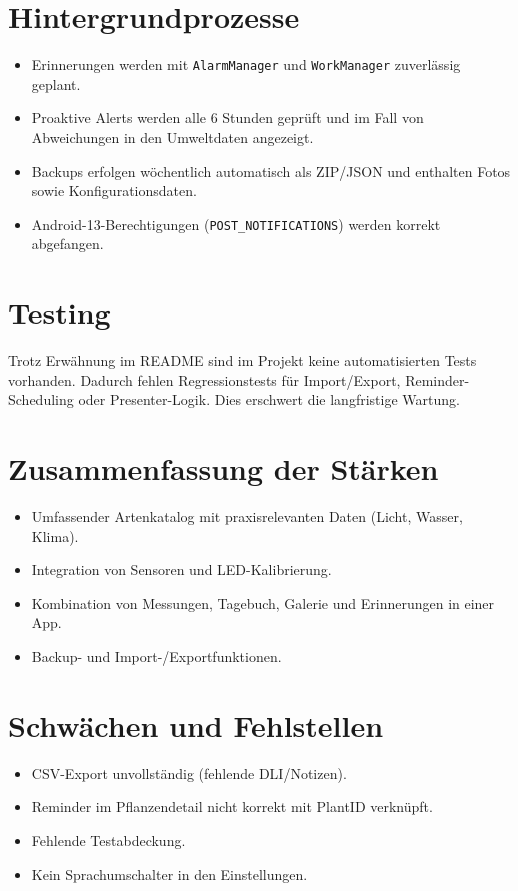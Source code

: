 \documentclass[14pt,a4paper]{report}
\begin{document}
\section{Hintergrundprozesse}
\begin{itemize}
    \item Erinnerungen werden mit \texttt{AlarmManager} und \texttt{WorkManager} zuverlässig geplant.
    \item Proaktive Alerts werden alle 6 Stunden geprüft und im Fall von Abweichungen in den Umweltdaten angezeigt.
    \item Backups erfolgen wöchentlich automatisch als ZIP/JSON und enthalten Fotos sowie Konfigurationsdaten.
    \item Android-13-Berechtigungen (\texttt{POST\_NOTIFICATIONS}) werden korrekt abgefangen.
\end{itemize}

\section{Testing}
Trotz Erwähnung im README sind im Projekt keine automatisierten Tests vorhanden. 
Dadurch fehlen Regressionstests für Import/Export, Reminder-Scheduling oder Presenter-Logik. 
Dies erschwert die langfristige Wartung.

\section{Zusammenfassung der Stärken}
\begin{itemize}
    \item Umfassender Artenkatalog mit praxisrelevanten Daten (Licht, Wasser, Klima).
    \item Integration von Sensoren und LED-Kalibrierung.
    \item Kombination von Messungen, Tagebuch, Galerie und Erinnerungen in einer App.
    \item Backup- und Import-/Exportfunktionen.
\end{itemize}

\section{Schwächen und Fehlstellen}
\begin{itemize}
    \item CSV-Export unvollständig (fehlende DLI/Notizen).
    \item Reminder im Pflanzendetail nicht korrekt mit PlantID verknüpft.
    \item Fehlende Testabdeckung.
    \item Kein Sprachumschalter in den Einstellungen.
\end{itemize}
\end{document}

